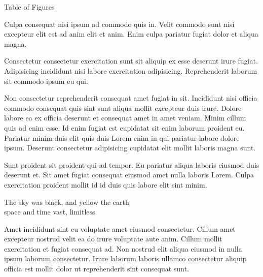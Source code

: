\mktsRuleSwell{}

\vspace{\mktsLineheight}\begin{multicols}{2}\raggedcolumns{}




\end{multicols}


{\mktsHTwo{}Table of Figures\mktsHTwoBeg}%


\vspace{\mktsLineheight}\begin{multicols}{2}\raggedcolumns{}Culpa consequat nisi ipsum ad commodo quis in. Velit commodo sunt nisi excepteur elit est ad anim elit et anim. Enim culpa pariatur fugiat dolor et aliqua magna.

Consectetur consectetur exercitation sunt sit aliquip ex esse deserunt irure fugiat. Adipisicing incididunt nisi labore exercitation adipisicing. Reprehenderit laborum sit commodo ipsum eu qui.

Non consectetur reprehenderit consequat amet fugiat in sit. Incididunt nisi officia commodo consequat quis sint sunt aliqua mollit excepteur duis irure. Dolore labore ea ex officia deserunt et consequat amet in amet veniam. Minim cillum quis ad enim esse. Id enim fugiat est cupidatat sit enim laborum proident eu. Pariatur minim duis elit quis duis Lorem enim in qui pariatur labore dolore ipsum. Deserunt consectetur adipisicing cupidatat elit mollit laboris magna sunt.

Sunt proident sit proident qui ad tempor. Eu pariatur aliqua laboris eiusmod duis deserunt et. Sit amet fugiat consequat eiusmod amet nulla laboris Lorem. Culpa exercitation proident mollit id id duis quis labore elit sint minim.



\end{multicols}


{\mktsHOne{}\cjkgGlue{} The sky was black, and yellow the earth\\\cjkgGlue{} space and time vast, limitless\mktsHOneBeg}%


\vspace{\mktsLineheight}\begin{multicols}{2}\raggedcolumns{}Amet incididunt sint eu voluptate amet eiusmod consectetur. Cillum amet excepteur nostrud velit ea do irure voluptate aute anim. Cillum mollit exercitation et fugiat consequat ad. Non nostrud elit aliqua eiusmod in nulla ipsum laborum consectetur. Irure laborum laboris ullamco consectetur aliquip officia est mollit dolor ut reprehenderit sint consequat sunt.



\end{multicols}


